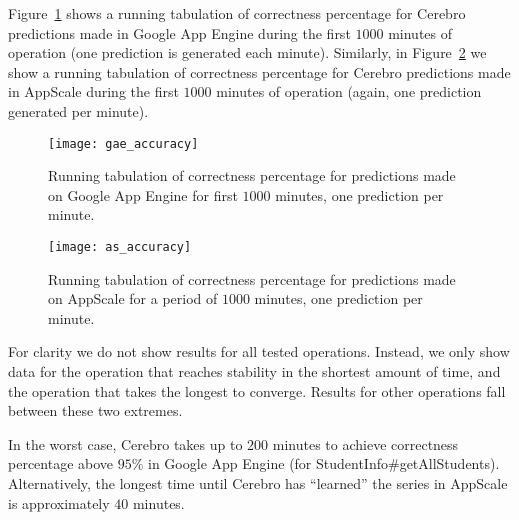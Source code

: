 Figure~\ref{fig:gae_accuracy} shows a running tabulation of
correctness percentage for Cerebro
predictions made in Google App Engine during the first 
$1000$ minutes of operation (one prediction is generated each minute). 
Similarly, in Figure~\ref{fig:as_accuracy} we show a running tabulation of
correctness percentage for Cerebro
predictions made in AppScale during the first 
$1000$ minutes of operation (again, one prediction generated per minute). 

\begin{figure}
\centering
\texttt{[image: gae\_accuracy]}
\caption{Running tabulation of correctness percentage for predictions made on Google App 
Engine for first $1000$ minutes, one prediction per minute.}
\label{fig:gae_accuracy}
\vspace{-0.2in}
\end{figure}

\begin{figure}
\centering
\texttt{[image: as\_accuracy]}
\caption{Running tabulation of correctness percentage for predictions made on AppScale for a period
of $1000$ minutes, one prediction per minute.}
\label{fig:as_accuracy}
\vspace{-0.2in}
\end{figure}

For clarity we do not show results for all tested operations. Instead,
we only show data for the operation that reaches stability in the shortest
amount of time, and the operation that takes the longest to converge.
Results for other operations fall between these two extremes.

In the worst case, Cerebro takes up to $200$ minutes to 
achieve correctness percentage above $95\%$
in Google App Engine (for StudentInfo\#getAllStudents).
Alternatively, the longest time until Cerebro has ``learned'' the series in
AppScale is approximately $40$ minutes.

